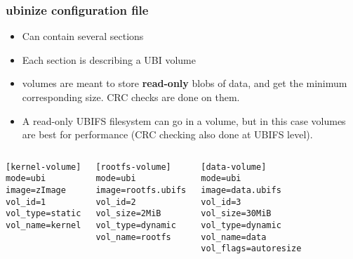 \begin{frame}[fragile]
  \frametitle{ubinize configuration file}
  \begin{itemize}
  \item Can contain several sections
  \item Each section is describing a UBI volume
  \item {} volumes are meant to store {\bf read-only} blobs of data,
	and get the minimum corresponding size. CRC checks are done on
        them.
  \item A read-only UBIFS filesystem can go in a 
	volume, but in this case  volumes are best
        for performance (CRC checking also done at UBIFS level).
  \end{itemize}
  \begin{columns}
\small
\begin{verbatim}
[kernel-volume]
mode=ubi
image=zImage
vol_id=1
vol_type=static
vol_name=kernel
\end{verbatim}
\small
\begin{verbatim}
[rootfs-volume]
mode=ubi
image=rootfs.ubifs
vol_id=2
vol_size=2MiB
vol_type=dynamic
vol_name=rootfs
\end{verbatim}
\small
\begin{verbatim}
[data-volume]
mode=ubi
image=data.ubifs
vol_id=3
vol_size=30MiB
vol_type=dynamic
vol_name=data
vol_flags=autoresize
\end{verbatim}
  \end{columns}
\end{frame}

